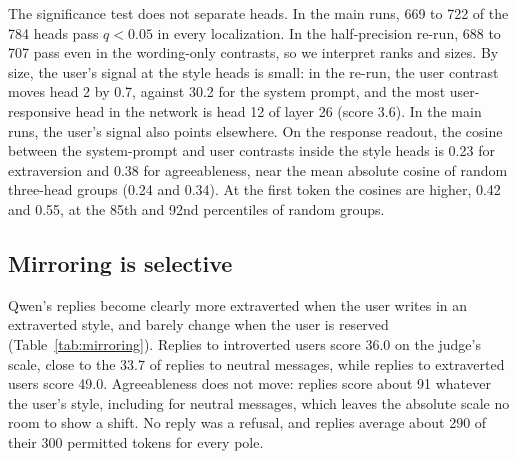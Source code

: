 The significance test does not separate heads. In the main runs, 669 to 722 of the 784 heads pass $q < 0.05$ in every localization. In the half-precision re-run, 688 to 707 pass even in the wording-only contrasts, so we interpret ranks and sizes. By size, the user's signal at the style heads is small: in the re-run, the user contrast moves head 2 by 0.7, against 30.2 for the system prompt, and the most user-responsive head in the network is head 12 of layer 26 (score 3.6). In the main runs, the user's signal also points elsewhere. On the response readout, the cosine between the system-prompt and user contrasts inside the style heads is 0.23 for extraversion and 0.38 for agreeableness, near the mean absolute cosine of random three-head groups (0.24 and 0.34). At the first token the cosines are higher, 0.42 and 0.55, at the 85th and 92nd percentiles of random groups.

\subsection{Mirroring is selective}
\label{sec:res-mirroring}

Qwen's replies become clearly more extraverted when the user writes in an extraverted style, and barely change when the user is reserved (Table~\ref{tab:mirroring}). Replies to introverted users score 36.0 on the judge's scale, close to the 33.7 of replies to neutral messages, while replies to extraverted users score 49.0. Agreeableness does not move: replies score about 91 whatever the user's style, including for neutral messages, which leaves the absolute scale no room to show a shift. No reply was a refusal, and replies average about 290 of their 300 permitted tokens for every pole.


